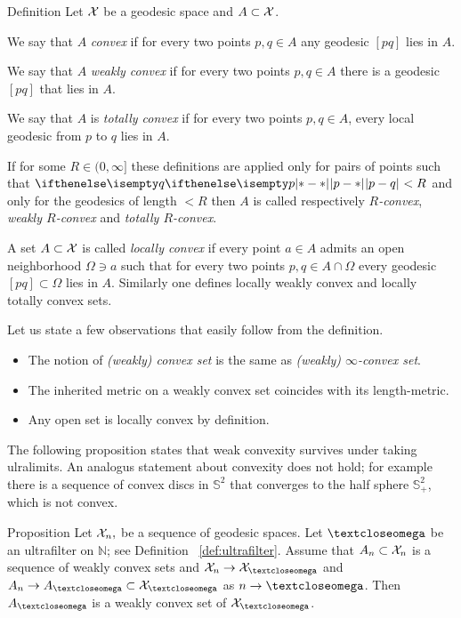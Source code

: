 \begin{thm}{Definition} 
\label{def:convex-set}
Let $\mathcal{X}$ be a geodesic space and $A\subset\spc{X}$.

We say that $A$ 
\emph{convex}%
if for every two points $p,q\in A$ any geodesic $[pq]$ lies in $A$.

We say that $A$ 
\emph{weakly convex}%
if for every two points $p,q\in A$
there is a geodesic $[pq]$ 
that lies in $A$.

We say that $A$ is \emph{totally convex}
if for every two points $p,q\in A$, every local geodesic from $p$ to $q$ lies in $A$.

If for some $R\in (0,\infty]$ these definitions are applied only for pairs of points such that $\dist{p}{q}{}<R$ and only for the geodesics of length $<R$
then $A$ is called respectively 
\emph{$R$-convex},
\emph{weakly  $R$-convex}%
and \emph{totally  $R$-convex}.

A set $A\subset\spc{X}$ is called 
\emph{locally convex}
if every point $a\in A$ admits an open neighborhood $\Omega\ni a$
such that for every two points $p,q\in A\cap\Omega$ every geodesic $[pq]\subset \Omega$ lies in $A$.
Similarly one defines locally weakly convex and locally totally convex sets. %
\end{thm}

 Let us state a few observations that easily follow  from the definition.
\begin{itemize}
\item The notion of \emph{(weakly) convex set} is the same as {}\emph{(weakly) $\infty$-convex set}.
\item The inherited metric on a weakly convex set coincides with its length-metric.
\item Any open set is locally convex by definition.
\end{itemize}

The following proposition states that weak convexity survives under taking ulralimits.
An analogus statement about convexity does not hold;
for example there is a sequence of convex discs in $\mathbb{S}^2$ that converges to the half sphere $\mathbb{S}^2_+$, which is not convex.

\begin{thm}{Proposition}\label{prop:weak-convex-stable}
Let $\mathcal{X}_n,$ be a sequence of geodesic spaces.
Let $\o$ be an ultrafilter on $\mathbb N$; see Definition ~\ref{def:ultrafilter}.
Assume that  $A_n\subset \spc{X}_n$ is a sequence of weakly convex sets and 
$\spc{X}_n\to \spc{X}_\o$ and $A_n\to A_\o\subset \spc{X}_\o$ as $n\to\o$.
Then $A_\o$ is a weakly convex set of $\spc{X}_\o$.
\end{thm}

